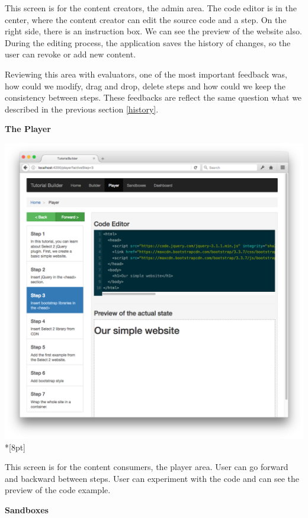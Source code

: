 \documentclass[12pt, a4paper, oneside, openright, medskipamount]{report}
\begin{document}
This screen is for the content creators, the admin area. The code editor is in the center, where the content creator can edit the source code and a step. On the right side, there is an instruction box. We can see the preview of the website also. During the editing process, the application saves the history of changes, so the user can revoke or add new content.

Reviewing this area with evaluators, one of the most important feedback was, how could we modify, drag and drop, delete steps and how could we keep the consistency between steps. These feedbacks are reflect the same question what we described in the previous section \ref{history}.

\newpage

\textbf{The Player}

\includegraphics[width=1\textwidth]{assets/tour-screenshots/the-player.png}\\*[8pt]

This screen is for the content consumers, the player area. User can go forward and backward between steps. User can experiment with the code and can see the preview of the code example.

\newpage

\textbf{Sandboxes}
\end{document}
